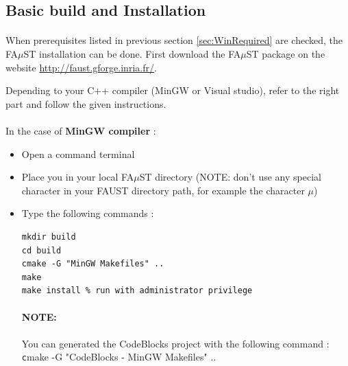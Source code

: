 \subsection{Basic build and Installation}\label{sec:WinBasicInstall}
\paragraph{}When prerequisites listed in previous section \ref{sec:WinRequired} are checked, the FA$\mu$ST installation can be done. 
First download the FA$\mu$ST package on the website  \url{http://faust.gforge.inria.fr/}. 

Depending to your C++ compiler (MinGW or Visual studio), refer to the right part and follow the given instructions.

\paragraph{}In the case of \textbf{MinGW compiler} :


\begin{itemize}
\item Open a command terminal
\item Place you in your local FA$\mu$ST directory (NOTE: don't use any special character in your FAUST directory path, for example the character $\mu$)
\item Type the following commands : 

\begin{lstlisting}
mkdir build
cd build
cmake -G "MinGW Makefiles" .. 
make
make install % run with administrator privilege
\end{lstlisting}
\paragraph{NOTE:} You can generated the CodeBlocks project with the following command : \\
\texttt cmake -G "CodeBlocks - MinGW Makefiles" .. 


\end{itemize}

